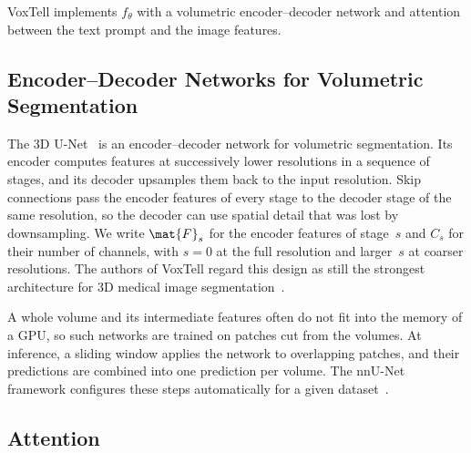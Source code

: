 VoxTell implements $f_\theta$ with a volumetric encoder--decoder network and attention between the text prompt and the image features.

\subsection{Encoder--Decoder Networks for Volumetric Segmentation}
\label{subsec:bg-unet}

The 3D U-Net~\cite{3d_unet} is an encoder--decoder network for volumetric segmentation.
Its encoder computes features at successively lower resolutions in a sequence of stages, and its decoder upsamples them back to the input resolution.
Skip connections pass the encoder features of every stage to the decoder stage of the same resolution, so the decoder can use spatial detail that was lost by downsampling.
We write $\mat{F}_s$ for the encoder features of stage~$s$ and $C_s$ for their number of channels, with $s = 0$ at the full resolution and larger~$s$ at coarser resolutions.
The authors of VoxTell regard this design as still the strongest architecture for 3D medical image segmentation~\cite[Sec.~3]{rokuss2025voxtellfreetextpromptableuniversal}.

A whole volume and its intermediate features often do not fit into the memory of a GPU, so such networks are trained on patches cut from the volumes.
At inference, a sliding window applies the network to overlapping patches, and their predictions are combined into one prediction per volume.
The nnU-Net framework configures these steps automatically for a given dataset~\cite{isensee2018nnunetselfadaptingframeworkunetbased}.

\subsection{Attention}
\label{subsec:bg-attention}

